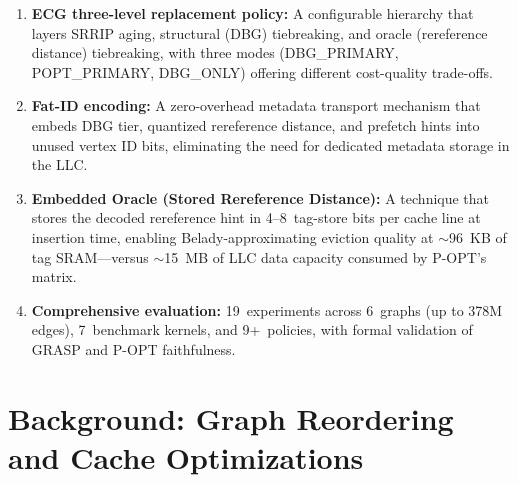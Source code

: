 \documentclass[conference]{IEEEtran}
\begin{document}
\begin{enumerate}[topsep=2pt,itemsep=0pt,wide]
    \item \textbf{ECG three-level replacement policy:} A configurable hierarchy that layers SRRIP aging, structural (DBG) tiebreaking, and oracle (rereference distance) tiebreaking, with three modes (DBG\_PRIMARY, POPT\_PRIMARY, DBG\_ONLY) offering different cost-quality trade-offs.
    \item \textbf{Fat-ID encoding:} A zero-overhead metadata transport mechanism that embeds DBG tier, quantized rereference distance, and prefetch hints into unused vertex ID bits, eliminating the need for dedicated metadata storage in the LLC.
    \item \textbf{Embedded Oracle (Stored Rereference Distance):} A technique that stores the decoded rereference hint in 4--8~tag-store bits per cache line at insertion time, enabling Belady-approximating eviction quality at $\sim$96~KB of tag SRAM---versus $\sim$15~MB of LLC data capacity consumed by P-OPT's matrix.
    \item \textbf{Comprehensive evaluation:} 19~experiments across 6~graphs (up to 378M edges), 7~benchmark kernels, and 9+~policies, with formal validation of GRASP and P-OPT faithfulness.
\end{enumerate}

\section{Background: Graph Reordering and Cache Optimizations} 

%   
\end{document}
